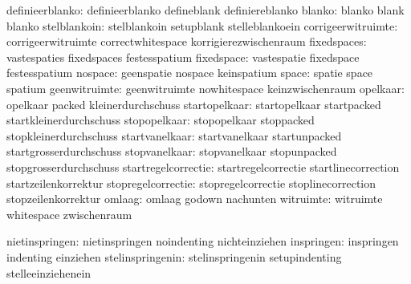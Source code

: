               definieerblanko:  definieerblanko              defineblank
                                definiereblanko
                       blanko:  blanko                       blank
                                blanko
                 stelblankoin:  stelblankoin                 setupblank
                                stelleblankoein
           corrigeerwitruimte:  corrigeerwitruimte           correctwhitespace
                                korrigierezwischenraum
                  fixedspaces:  vastespaties                 fixedspaces
                                festesspatium %
                   fixedspace:  vastespatie                  fixedspace 
                                festesspatium %
                      nospace:  geenspatie                   nospace
                                keinspatium
                        space:  spatie                       space
                                spatium
                geenwitruimte:  geenwitruimte                nowhitespace
                                keinzwischenraum
                     opelkaar:  opelkaar                     packed
                                kleinerdurchschuss
                startopelkaar:  startopelkaar                startpacked
                                startkleinerdurchschuss
                 stopopelkaar:  stopopelkaar                 stoppacked
                                stopkleinerdurchschuss
               startvanelkaar:  startvanelkaar               startunpacked
                                startgrosserdurchschuss
                stopvanelkaar:  stopvanelkaar                stopunpacked
                                stopgrosserdurchschuss
          startregelcorrectie:  startregelcorrectie          startlinecorrection
                                startzeilenkorrektur
           stopregelcorrectie:  stopregelcorrectie           stoplinecorrection
                                stopzeilenkorrektur
                       omlaag:  omlaag                       godown
                                nachunten
                    witruimte:  witruimte                    whitespace
                                zwischenraum

               nietinspringen:  nietinspringen               noindenting
                                nichteinziehen
                   inspringen:  inspringen                   indenting
                                einziehen
             stelinspringenin:  stelinspringenin             setupindenting
                                stelleeinziehenein

